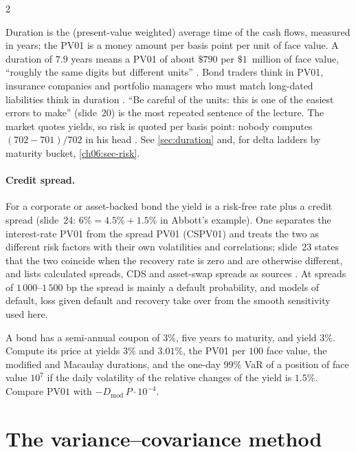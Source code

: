 \begin{paracol}{2}
\begin{finance}\label{ch19:fin-pv01}
Duration is the (present-value weighted) average time of the cash flows, measured in years; the PV01 is a money amount per basis point per unit of face value. A duration of $7.9$ years means a PV01 of about $\$790$ per $\$1$~million of face value, ``roughly the same digits but different units'' . Bond traders think in PV01, insurance companies and portfolio managers who must match long-dated liabilities think in duration . ``Be careful of the units: this is one of the easiest errors to make'' (slide~20) is the most repeated sentence of the lecture. The market quotes yields, so risk is quoted per basis point: nobody computes $(702-701)/702$ in his head . See \cref{sec:duration} and, for delta ladders by maturity bucket, \cref{ch06:sec-risk}.
\end{finance}

\paragraph{Credit spread.} For a corporate or asset-backed bond the yield is a risk-free rate plus a credit spread (slide~24: $6\%=4.5\%+1.5\%$ in Abbott's example). One separates the interest-rate PV01 from the spread PV01 (CSPV01) and treats the two as different risk factors with their own volatilities and correlations; slide~23 states that the two coincide when the recovery rate is zero and are otherwise different, and lists calculated spreads, CDS and asset-swap spreads as sources . At spreads of $1\,000$--$1\,500$ bp the spread is mainly a default probability, and models of default, loss given default and recovery take over from the smooth sensitivity used here.

\begin{exercise}
A bond has a semi-annual coupon of $3\%$, five years to maturity, and yield $3\%$. Compute its price at yields $3\%$ and $3.01\%$, the PV01 per $100$ face value, the modified and Macaulay durations, and the one-day $99\%$ VaR of a position of face value $10^7$ if the daily volatility of the relative changes of the yield is $1.5\%$. Compare $\mathrm{PV01}$ with $-D_{\mathrm{mod}}\,P\cdot10^{-4}$.
\end{exercise}

\section{The variance--covariance method}\label{ch19:sec-vc}

\end{paracol}
